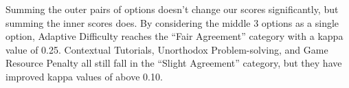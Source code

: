 				Summing the outer pairs of options doesn't change our scores significantly, but summing the inner scores does. By considering the middle 3 options as a single option, Adaptive Difficulty reaches the ``Fair Agreement'' category with a kappa value of 0.25. Contextual Tutorials, Unorthodox Problem-solving, and Game Resource Penalty all still fall in the ``Slight Agreement'' category, but they have improved kappa values of above 0.10.
				
			













